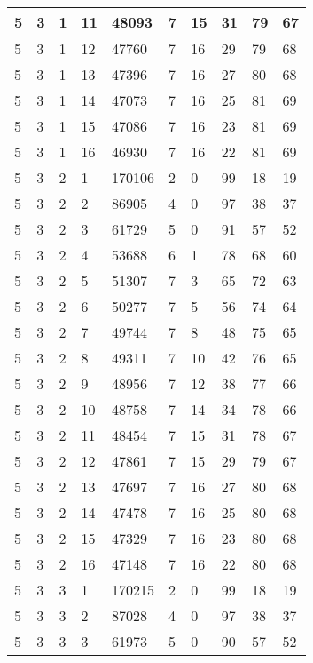 \begin{table}[!ht]
\begin{tabular}{|l|l|l|l|l|l|l|l|l|l|}
        5 & 3 & 1 & 11 & 48093 & 7 & 15 & 31 & 79 & 67 \\ \hline
        5 & 3 & 1 & 12 & 47760 & 7 & 16 & 29 & 79 & 68 \\ \hline
        5 & 3 & 1 & 13 & 47396 & 7 & 16 & 27 & 80 & 68 \\ \hline
        5 & 3 & 1 & 14 & 47073 & 7 & 16 & 25 & 81 & 69 \\ \hline
        5 & 3 & 1 & 15 & 47086 & 7 & 16 & 23 & 81 & 69 \\ \hline
        5 & 3 & 1 & 16 & 46930 & 7 & 16 & 22 & 81 & 69 \\ \hline
        5 & 3 & 2 & 1 & 170106 & 2 & 0 & 99 & 18 & 19 \\ \hline
        5 & 3 & 2 & 2 & 86905 & 4 & 0 & 97 & 38 & 37 \\ \hline
        5 & 3 & 2 & 3 & 61729 & 5 & 0 & 91 & 57 & 52 \\ \hline
        5 & 3 & 2 & 4 & 53688 & 6 & 1 & 78 & 68 & 60 \\ \hline
        5 & 3 & 2 & 5 & 51307 & 7 & 3 & 65 & 72 & 63 \\ \hline
        5 & 3 & 2 & 6 & 50277 & 7 & 5 & 56 & 74 & 64 \\ \hline
        5 & 3 & 2 & 7 & 49744 & 7 & 8 & 48 & 75 & 65 \\ \hline
        5 & 3 & 2 & 8 & 49311 & 7 & 10 & 42 & 76 & 65 \\ \hline
        5 & 3 & 2 & 9 & 48956 & 7 & 12 & 38 & 77 & 66 \\ \hline
        5 & 3 & 2 & 10 & 48758 & 7 & 14 & 34 & 78 & 66 \\ \hline
        5 & 3 & 2 & 11 & 48454 & 7 & 15 & 31 & 78 & 67 \\ \hline
        5 & 3 & 2 & 12 & 47861 & 7 & 15 & 29 & 79 & 67 \\ \hline
        5 & 3 & 2 & 13 & 47697 & 7 & 16 & 27 & 80 & 68 \\ \hline
        5 & 3 & 2 & 14 & 47478 & 7 & 16 & 25 & 80 & 68 \\ \hline
        5 & 3 & 2 & 15 & 47329 & 7 & 16 & 23 & 80 & 68 \\ \hline
        5 & 3 & 2 & 16 & 47148 & 7 & 16 & 22 & 80 & 68 \\ \hline
        5 & 3 & 3 & 1 & 170215 & 2 & 0 & 99 & 18 & 19 \\ \hline
        5 & 3 & 3 & 2 & 87028 & 4 & 0 & 97 & 38 & 37 \\ \hline
        5 & 3 & 3 & 3 & 61973 & 5 & 0 & 90 & 57 & 52 \\ \hline

\end{tabular}
\end{table}
